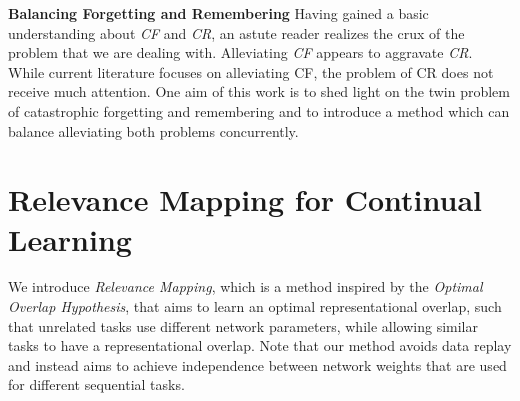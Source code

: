 \documentclass{article}
\begin{document}
\textbf{Balancing Forgetting and Remembering}
Having gained a basic understanding about \textit{CF} and \textit{CR}, an astute reader realizes the crux of the problem that we are dealing with. 
Alleviating \textit{CF} appears to aggravate \textit{CR}.
While current literature focuses on alleviating CF, the problem of CR does not receive much attention. 
One aim of this work is to shed light on the twin problem of catastrophic forgetting and remembering and to introduce a 
method which can balance alleviating both problems concurrently. 

\section{Relevance Mapping for Continual Learning}\label{amm}
We introduce \textit{Relevance Mapping}, which is a method inspired by the \textit{Optimal Overlap Hypothesis}, that aims to learn an optimal representational overlap, such that unrelated tasks use different network parameters, while allowing similar tasks to have a representational overlap. 
Note that our method avoids data replay and instead aims to achieve independence between network weights that are used for different sequential tasks.
\end{document}
